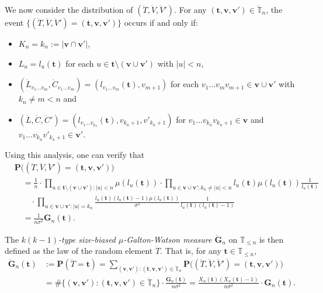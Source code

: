 \documentclass[12pt,a4paper]{amsart}
\numberwithin{equation}{section}
\begin{document}
	We now consider the distribution of $(\ddot T,\ddot V,\ddot V')$. 
	For any $( \mathbf t , \mathbf v, \mathbf v')\in\ddot {\mathbb T}_n$, the event $\{(\ddot T,\ddot V,\ddot V')=( \mathbf t , \mathbf v, \mathbf v')\}$ occurs if and only if:
\begin{itemize}
\item
    $K_n=k_n:=| \mathbf v\cap \mathbf v'|$,
\item
    $L_u=l_u( \mathbf t )$ for each $u\in  \mathbf t \setminus( \mathbf v\cup \mathbf v')$ with $| u| <n$,
\item
	$(\dot L_{v_1\dots v_m},\dot C_{v_1\dots v_m})=(l_{v_1\dots v_m}( \mathbf t ),v_{m+1})$ for each $v_1\dots v_mv_{m+1}\in \mathbf v\cup \mathbf v'$ with $k_n\neq m<n$ and
\item
	$(\ddot L,\ddot C,\ddot C')=(l_{v_1\dots v_{k_n}}( \mathbf t ),v_{k_n+1},v'_{k_n+1})$ for $v_1\dots v_{k_n}v_{k_n+1}\in \mathbf v$ and $v_1\dots v_{k_n}v'_{k_n+1}\in \mathbf v'$.
\end{itemize}
	Using this analysis, one can verify that
\begin{align*}
		&\mathbf P\big((\ddot T,\ddot V,\ddot V')=( \mathbf t , \mathbf v, \mathbf v')\big)\\
	&\quad= \frac{1}{n} \cdot \prod_{u\in  \mathbf t \setminus( \mathbf v\cup  \mathbf v'):|u|<n} \mu(l_u( \mathbf t )) \cdot \prod_{u\in  \mathbf v\cup  \mathbf v':k_n\neq|u|<n}l_u( \mathbf t ) \mu(l_u( \mathbf t ))\frac{1}{l_u( \mathbf t )}
    \\&\qquad \cdot \prod_{u\in  \mathbf v \cup  \mathbf v':|u|=k_n}\frac{l_u( \mathbf t )(l_u( \mathbf t )-1) \mu(l_u( \mathbf t ))}{\sigma^2}\frac{1}{l_u( \mathbf t )(l_u( \mathbf t )-1)}\\
	&\quad = \frac{1}{n\sigma^2} \mathbf G_n( \mathbf t ).
\end{align*}
	
	The \emph{$k(k-1)$-type size-biased $\mu$-Galton-Watson measure $\ddot{\mathbf G}_n$} on $\mathbb T_{\leq n}$ is then defined as the law of the random element $\ddot T$. That is, for any $ \mathbf t \in\mathbb T_{\leq n}$,
\begin{equation}
\label{eq:k(k-1)typesizebiasedGWmeasure}
\begin{split}
		\ddot{\mathbf G}_n( \mathbf t )
	&:= \mathbf P(\ddot T= \mathbf t )
	= \sum_{( \mathbf v, \mathbf v'):( \mathbf t , \mathbf v, \mathbf v')\in \ddot {\mathbb T}_n} \mathbf P\big((\ddot T,\ddot V,\ddot V')=( \mathbf t , \mathbf v, \mathbf v')\big)
	\\&= \#\{( \mathbf v, \mathbf v'):( \mathbf t , \mathbf v, \mathbf v')\in \ddot {\mathbb T}_n\} \cdot \frac{\mathbf G_n( \mathbf t )}{n\sigma^2}
	= \frac{X_n( \mathbf t )(X_n( \mathbf t )-1)}{n\sigma^2} \cdot{\mathbf G}_n( \mathbf t ).
\end{split}
\end{equation}
\end{document}
